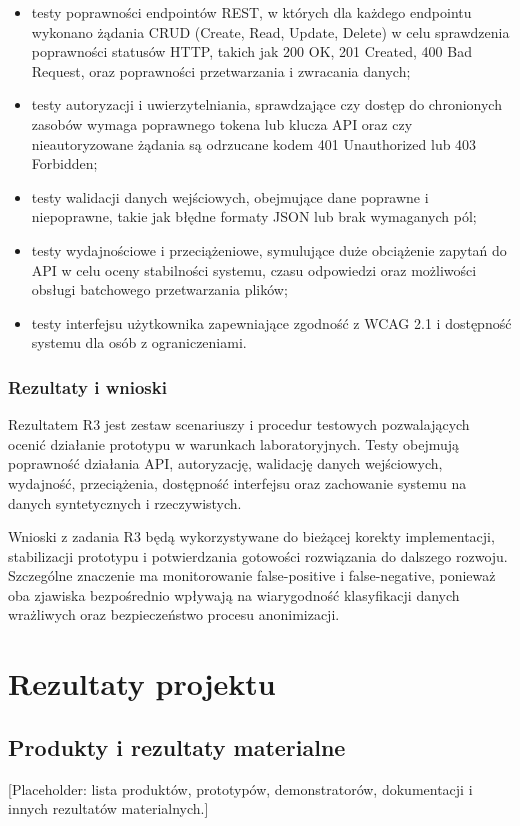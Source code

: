 \documentclass[12pt,a4paper]{report}
\begin{document}
\begin{itemize}
    \item testy poprawności endpointów REST, w których dla każdego endpointu wykonano żądania CRUD (Create, Read, Update, Delete) w celu sprawdzenia poprawności statusów HTTP, takich jak 200 OK, 201 Created, 400 Bad Request, oraz poprawności przetwarzania i zwracania danych;
    \item testy autoryzacji i uwierzytelniania, sprawdzające czy dostęp do chronionych zasobów wymaga poprawnego tokena lub klucza API oraz czy nieautoryzowane żądania są odrzucane kodem 401 Unauthorized lub 403 Forbidden;
    \item testy walidacji danych wejściowych, obejmujące dane poprawne i niepoprawne, takie jak błędne formaty JSON lub brak wymaganych pól;
    \item testy wydajnościowe i przeciążeniowe, symulujące duże obciążenie zapytań do API w celu oceny stabilności systemu, czasu odpowiedzi oraz możliwości obsługi batchowego przetwarzania plików;
    \item testy interfejsu użytkownika zapewniające zgodność z WCAG 2.1 i dostępność systemu dla osób z ograniczeniami.
\end{itemize}

\subsection{Rezultaty i wnioski}
Rezultatem R3 jest zestaw scenariuszy i procedur testowych pozwalających ocenić działanie prototypu w warunkach laboratoryjnych. Testy obejmują poprawność działania API, autoryzację, walidację danych wejściowych, wydajność, przeciążenia, dostępność interfejsu oraz zachowanie systemu na danych syntetycznych i rzeczywistych.

Wnioski z zadania R3 będą wykorzystywane do bieżącej korekty implementacji, stabilizacji prototypu i potwierdzania gotowości rozwiązania do dalszego rozwoju. Szczególne znaczenie ma monitorowanie false-positive i false-negative, ponieważ oba zjawiska bezpośrednio wpływają na wiarygodność klasyfikacji danych wrażliwych oraz bezpieczeństwo procesu anonimizacji.


\chapter{Rezultaty projektu}
\section{Produkty i rezultaty materialne}
[Placeholder: lista produktów, prototypów, demonstratorów, dokumentacji i innych rezultatów materialnych.]
\end{document}
